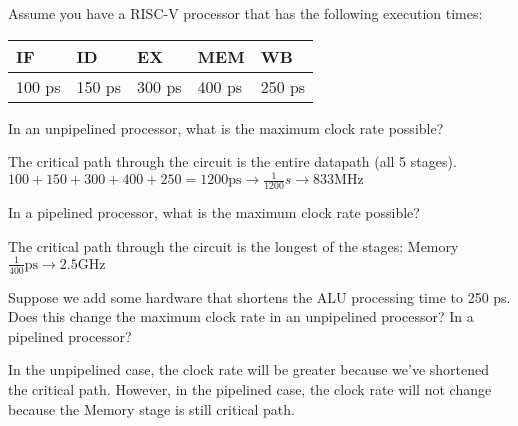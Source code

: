 \begin{blocksection}
\question
Assume you have a RISC-V processor that has the following execution times:

\begin{tabular}{ |l|l|l|l|l| } 
 \hline
 IF & ID & EX & MEM & WB \\
 \hline
 100 ps & 150 ps & 300 ps & 400 ps & 250 ps \\
 \hline
\end{tabular}

\begin{parts}
\item In an unpipelined processor, what is the maximum clock rate possible?

\begin{solution}[0.5in]
The critical path through the circuit is the entire datapath (all 5 stages).
$100 + 150 + 300 + 400 + 250 = 1200 \text{ps} \rightarrow \frac{1}{1200} s \rightarrow 833 \text{MHz}$
\end{solution}

\item In a pipelined processor, what is the maximum clock rate possible?

\begin{solution}[0.5in]
The critical path through the circuit is the longest of the stages: Memory
$\frac{1}{400} \text{ps} \rightarrow 2.5 \text{GHz}$
\end{solution}

\item Suppose we add some hardware that shortens the ALU processing time to 250 ps. Does this change the maximum clock rate in an unpipelined processor? In a pipelined processor?

\begin{solution}[0.5in]
In the unpipelined case, the clock rate will be greater because we’ve shortened the critical path. However, in the pipelined case, the clock rate will not change because the Memory stage is still critical path.
\end{solution}

\end{parts}
\end{blocksection}